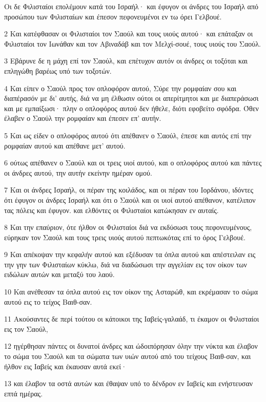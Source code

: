 \par Οι δε Φιλισταίοι επολέμουν κατά του Ισραήλ· και έφυγον οι άνδρες του Ισραήλ από προσώπου των Φιλισταίων και έπεσον πεφονευμένοι εν τω όρει Γελβουέ.
\par 2 Και κατέφθασαν οι Φιλισταίοι τον Σαούλ και τους υιούς αυτού· και επάταξαν οι Φιλισταίοι τον Ιωνάθαν και τον Αβιναδάβ και τον Μελχί-σουέ, τους υιούς του Σαούλ.
\par 3 Εβάρυνε δε η μάχη επί τον Σαούλ, και επέτυχον αυτόν οι άνδρες οι τοξόται και επληγώθη βαρέως υπό των τοξοτών.
\par 4 Και είπεν ο Σαούλ προς τον οπλοφόρον αυτού, Σύρε την ρομφαίαν σου και διαπέρασόν με δι' αυτής, διά να μη έλθωσιν ούτοι οι απερίτμητοι και με διαπεράσωσι και με εμπαίξωσι· πλην ο οπλοφόρος αυτού δεν ήθελε, διότι εφοβείτο σφόδρα. Όθεν έλαβεν ο Σαούλ την ρομφαίαν και έπεσεν επ' αυτήν.
\par 5 Και ως είδεν ο οπλοφόρος αυτού ότι απέθανεν ο Σαούλ, έπεσε και αυτός επί την ρομφαίαν αυτού και απέθανε μετ' αυτού.
\par 6 ούτως απέθανεν ο Σαούλ και οι τρεις υιοί αυτού, και ο οπλοφόρος αυτού και πάντες οι άνδρες αυτού, την αυτήν εκείνην ημέραν ομού.
\par 7 Και οι άνδρες Ισραήλ, οι πέραν της κοιλάδος, και οι πέραν του Ιορδάνου, ιδόντες ότι έφυγον οι άνδρες Ισραήλ και ότι ο Σαούλ και οι υιοί αυτού απέθανον, κατέλιπον τας πόλεις και έφυγον. και ελθόντες οι Φιλισταίοι κατώκησαν εν αυταίς.
\par 8 Και την επαύριον, ότε ήλθον οι Φιλισταίοι διά να εκδύσωσι τους πεφονευμένους, εύρηκαν τον Σαούλ και τους τρεις υιούς αυτού πεπτωκότας επί το όρος Γελβουέ.
\par 9 Και απέκοψαν την κεφαλήν αυτού και εξέδυσαν τα όπλα αυτού και απέστειλαν εις την γην των Φιλισταίων κύκλω, διά να διαδώσωσι την αγγελίαν εις τον οίκον των ειδώλων αυτών και μεταξύ του λαού.
\par 10 Και ανέθεσαν τα όπλα αυτού εις τον οίκον της Ασταρώθ, και εκρέμασαν το σώμα αυτού εις το τείχος Βαιθ-σαν.
\par 11 Ακούσαντες δε περί τούτου οι κάτοικοι της Ιαβείς-γαλαάδ, τι έκαμον οι Φιλισταίοι εις τον Σαούλ,
\par 12 ηγέρθησαν πάντες οι δυνατοί άνδρες και ώδοιπόρησαν όλην την νύκτα και έλαβον το σώμα του Σαούλ και τα σώματα των υιών αυτού από του τείχους Βαιθ-σαν, και ήλθον εις Ιαβείς και έκαυσαν αυτά εκεί·
\par 13 και έλαβον τα οστά αυτών και έθαψαν υπό το δένδρον εν Ιαβείς και ενήστευσαν επτά ημέρας.


